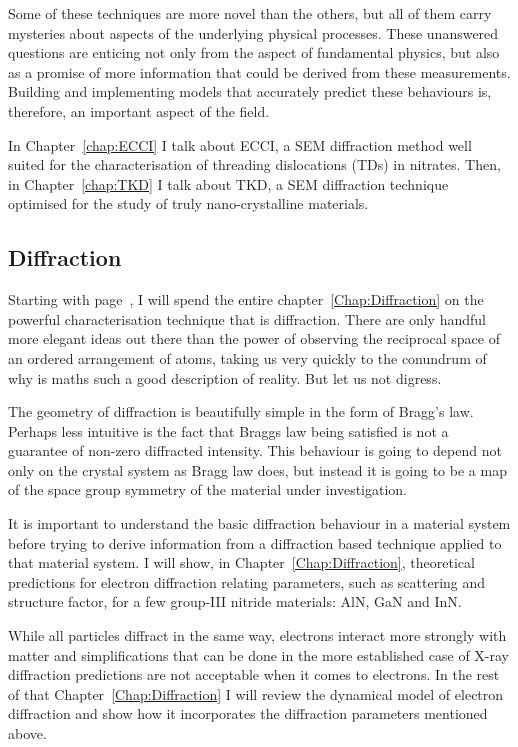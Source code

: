 Some of these techniques are more novel than the others, but all of them carry mysteries about aspects of the underlying physical processes. These unanswered questions are enticing not only from the aspect of fundamental physics, but also as a promise of more information that could be derived from these measurements. Building and implementing models that accurately predict these behaviours is, therefore, an important aspect of the field. 

In Chapter~\ref{chap:ECCI} I talk about ECCI, a SEM diffraction method  well suited for the characterisation of threading dislocations (TDs) in nitrates. Then, in Chapter~\ref{chap:TKD} I talk about TKD, a SEM diffraction technique optimised for the study of truly nano-crystalline materials.  





\subsection{Diffraction}

Starting with page~\pageref{Chap:Diffraction}, I will spend the entire chapter~\ref{Chap:Diffraction} on the powerful characterisation technique that is diffraction. There are only handful more elegant ideas out there than the power of observing the reciprocal space of an ordered arrangement of atoms, taking us very quickly to the conundrum of why is maths such a good description of reality.  But let us not digress. 

The geometry of diffraction is beautifully simple in the form of Bragg's law. Perhaps less intuitive is the fact that Braggs law being satisfied is not a guarantee of non-zero diffracted intensity. This behaviour is going to depend not only on the crystal system as Bragg law does, but instead it is going to be a map of the space group symmetry of the material under investigation. 

It is important to understand the basic diffraction behaviour in a material system before trying to derive information from a diffraction based technique applied to that material system. I will show, in Chapter~\ref{Chap:Diffraction}, theoretical predictions for electron diffraction relating parameters, such as scattering and structure factor, for a few group-III nitride materials: AlN, GaN and InN. 

While all particles diffract in the same way, electrons interact more strongly with matter and simplifications that can be done in the more established case of X-ray diffraction predictions are not acceptable when it comes to electrons. In the rest of that Chapter~\ref{Chap:Diffraction} I will review the dynamical model of electron diffraction and show how it incorporates the diffraction parameters mentioned above.

